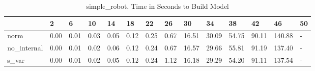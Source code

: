 \begin{table}
\caption{simple_robot, Time in Seconds to Build Model}
\label{simple_robot_model_time}
\begin{tabular}{llllllllllllll}
\toprule
 & 2 & 6 & 10 & 14 & 18 & 22 & 26 & 30 & 34 & 38 & 42 & 46 & 50 \\
\midrule
norm & 0.00 & 0.01 & 0.03 & 0.05 & 0.12 & 0.25 & 0.67 & 16.51 & 30.09 & 54.75 & 90.11 & 140.88 & - \\
no_internal & 0.00 & 0.01 & 0.02 & 0.06 & 0.12 & 0.24 & 0.67 & 16.57 & 29.66 & 55.81 & 91.19 & 137.40 & - \\
s_var & 0.00 & 0.01 & 0.02 & 0.05 & 0.12 & 0.24 & 1.12 & 16.18 & 29.29 & 54.20 & 91.11 & 137.54 & - \\
\bottomrule
\end{tabular}
\end{table}
